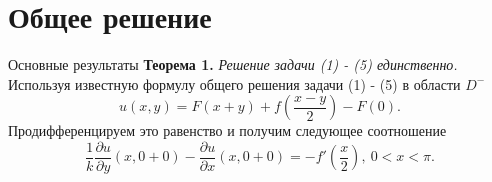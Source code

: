 \documentclass[10pt,pdf,hyperref={unicode}]{beamer}
\begin{document}
\section{Общее решение}
\begin{frame}{Основные результаты}
	\textbf{Теорема 1.} \textit{Решение задачи (1) - (5) единственно.}
	\newline
	\newline
	Используя известную формулу общего решения задачи (1) - (5) в области $D^-$ 
	\begin{equation*}
			u(x,y) = F(x+y) + f(\dfrac{x-y}{2}) - F(0).
	\end{equation*}
	Продифференцируем это равенство и получим следующее соотношение
	\begin{equation*}
		\dfrac{1}{k} \dfrac{\partial u}{\partial y}(x, 0+0) - \dfrac{\partial u}{\partial x}(x, 0 + 0) = - f'\left(\dfrac{x}2\right), \ 0 < x < \pi. 
	\end{equation*}
\end{frame}
\end{document}
